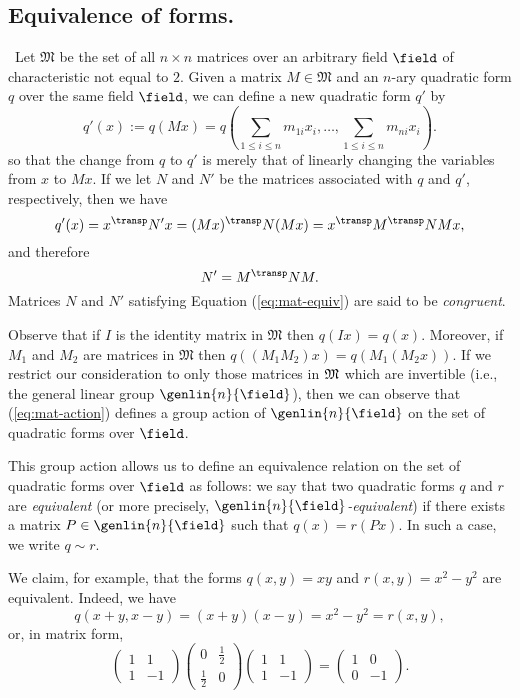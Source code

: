 \subsection{Equivalence of forms.}\label{sec:mat-equiv}~Let \(\mathfrak{M}\) be the set of all \(n \times n\) matrices over an arbitrary field \(\field\) of characteristic not equal to \(2\). Given a matrix \(M \in \mathfrak{M}\) and an \(n\)-ary quadratic form \(q\) over the same field \(\field\), we can define a new quadratic form \(q'\) by
\begin{equation}\label{eq:mat-action}
  q'(x) := q(Mx) = q\left(\sum_{1 \leq i \leq n} m_{1i}x_i, \dots, \sum_{1 \leq i \leq n} m_{ni}x_i\right).
\end{equation}
so that the change from \(q\) to \(q'\) is merely that of linearly changing the variables from \(x\) to \(Mx\). If we let \(N\) and \(N'\) be the matrices associated with \(q\) and \(q'\), respectively, then we have
\[
  q'(x) = x^{\transp}N'x = (Mx)^{\transp}N(Mx) = x^{\transp} M^{\transp}NMx,
\]
and therefore
\begin{equation}\label{eq:mat-equiv}
  N' = M^{\transp}NM.
\end{equation}
Matrices \(N\) and \(N'\) satisfying Equation (\ref{eq:mat-equiv}) are said to be \emph{congruent}.

Observe that if \(I\) is the identity matrix in \(\mathfrak{M}\) then \(q(Ix) = q(x)\). Moreover, if \(M_1\) and \(M_2\) are matrices in \(\mathfrak{M}\) then \(q((M_1M_2)x) = q(M_1(M_2x))\). If we restrict our consideration to only those matrices in \(\frak{M}\) which are invertible (i.e., the general linear group \(\genlin{n}{\field}\)), then we can observe that (\ref{eq:mat-action}) defines a group action of \(\genlin{n}{\field}\) on the set of quadratic forms over \(\field\).

This group action allows us to define an equivalence relation \cite[p.~89]{hungerford2012algebra} on the set of quadratic forms over \(\field\) as follows: we say that two quadratic forms \(q\) and \(r\) are \emph{equivalent} (or more precisely, \emph{\(\genlin{n}{\field}\)-equivalent}) if there exists a matrix \(P \in \genlin{n}{\field}\) such that \(q(x) = r(Px)\). In such a case, we write \(q \sim r\).

We claim, for example, that the forms \(q(x, y) = xy\) and \(r(x, y) = x^2 - y^2\) are equivalent. Indeed, we have
\[
  q(x+y, x-y) = (x+y)(x-y) = x^2 - y^2 = r(x, y),
\]
or, in matrix form,
\[
  \begin{pmatrix}
    1 & 1 \\
    1 & -1
  \end{pmatrix}
  \begin{pmatrix}
    0 & \frac{1}{2} \\
    \frac{1}{2} & 0
  \end{pmatrix}
  \begin{pmatrix}
    1 & 1 \\
    1 & -1
  \end{pmatrix}
  =
  \begin{pmatrix}
    1 & 0 \\
    0 & -1
  \end{pmatrix}.
\]


